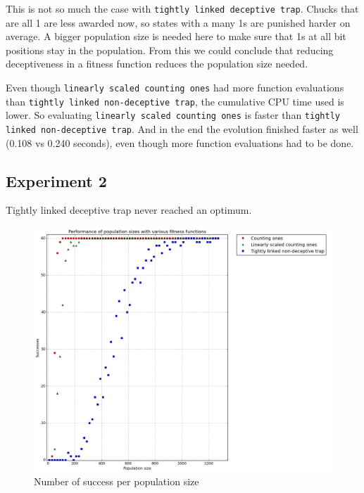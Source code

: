 \documentclass[12pt]{article}
\theoremstyle{definition}
\newcommand{\lsco}{\texttt{linearly scaled counting ones}}
\newcommand{\tdt}{\texttt{tightly linked deceptive trap}}
\newcommand{\tnt}{\texttt{tightly linked non-deceptive trap}}
\begin{document}
This is not so much the case with \tdt{}.
Chucks that are all 1 are less awarded now, so states with a many 1s are punished harder
on average.
A bigger population size is needed here to make sure that 1s at all bit positions stay in the
population.
From this we could conclude that reducing deceptiveness in a fitness function
reduces the population size needed.

Even though \lsco{} had more function evaluations than \tnt{}, the cumulative CPU time used
is lower.
So evaluating \lsco{} is faster than \tnt{}.
And in the end the evolution finished faster as well (0.108 vs 0.240 seconds),
even though more function evaluations had to be done.


\subsection*{Experiment 2}
Tightly linked deceptive trap never reached an optimum.

\begin{figure}[H]
    \centering
    \includegraphics[totalheight=0.7\textheight]{images/exp2.png}
    \caption{Number of success per population size}
\label{fig:exp2}
\end{figure}
\end{document}
